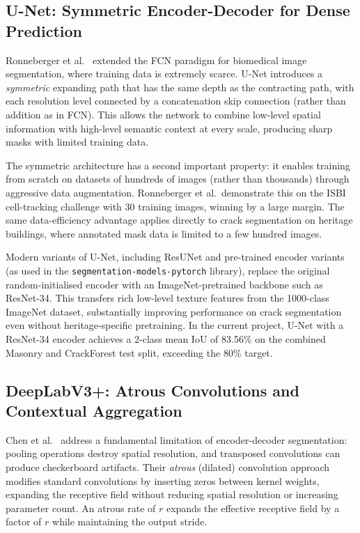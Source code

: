 \documentclass[12pt,a4paper]{article}
\begin{document}
\subsection{U-Net: Symmetric Encoder-Decoder for Dense Prediction}

Ronneberger et al.~\cite{ronneberger2015unet} extended the FCN paradigm for biomedical image segmentation, where training data is extremely scarce. U-Net introduces a \textit{symmetric} expanding path that has the same depth as the contracting path, with each resolution level connected by a concatenation skip connection (rather than addition as in FCN). This allows the network to combine low-level spatial information with high-level semantic context at every scale, producing sharp masks with limited training data.

The symmetric architecture has a second important property: it enables training from scratch on datasets of hundreds of images (rather than thousands) through aggressive data augmentation. Ronneberger et al.\ demonstrate this on the ISBI cell-tracking challenge with 30 training images, winning by a large margin. The same data-efficiency advantage applies directly to crack segmentation on heritage buildings, where annotated mask data is limited to a few hundred images.

Modern variants of U-Net, including ResUNet \cite{surv:zhang2018road} and pre-trained encoder variants (as used in the \texttt{segmentation-models-pytorch} library), replace the original random-initialised encoder with an ImageNet-pretrained backbone such as ResNet-34. This transfers rich low-level texture features from the 1000-class ImageNet dataset, substantially improving performance on crack segmentation even without heritage-specific pretraining. In the current project, U-Net with a ResNet-34 encoder achieves a 2-class mean IoU of 83.56\% on the combined Masonry and CrackForest test split, exceeding the 80\% target.

\subsection{DeepLabV3+: Atrous Convolutions and Contextual Aggregation}

Chen et al.~\cite{surv:chen2018deeplabv3plus} address a fundamental limitation of encoder-decoder segmentation: pooling operations destroy spatial resolution, and transposed convolutions can produce checkerboard artifacts. Their \textit{atrous} (dilated) convolution approach modifies standard convolutions by inserting zeros between kernel weights, expanding the receptive field without reducing spatial resolution or increasing parameter count. An atrous rate of $r$ expands the effective receptive field by a factor of $r$ while maintaining the output stride.
\end{document}
